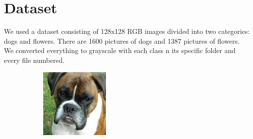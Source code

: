 \documentclass{report}
\begin{document}
\chapter{Dataset}
We used a dataset consisting of 128x128 RGB images divided into two categories: dogs and flowers. There are 1600 pictures of dogs and 1387 pictures of flowers.
We converted everything to grayscale with each class n its specific folder and every file numbered.

\begin{figure}[h!]
  \centering
  \begin{subfigure}[t]{0.19\textwidth}
    \centering
    \includegraphics[width=\textwidth]{dataset/dog_0.jpg}
    \label{fig:dataset-sub1}
  \end{subfigure}
  \hfill
  \begin{subfigure}[t]{0.19\textwidth}
    \centering

\end{subfigure}
\end{figure}
\end{document}
